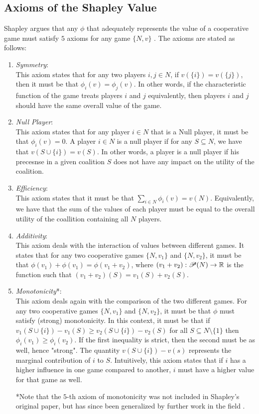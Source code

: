 \subsection{Axioms of the Shapley Value}
\label{sec:axioms}

Shapley argues that any $\phi$ that adequately represents the value of a cooperative game must satisfy $5$ axioms for any game $\{N,v\}$  \citep{shapleyValue}. The axioms are stated as follows:
\begin{enumerate}
    \item \textit{Symmetry}: \\
    This axiom states that for any two players $i,j \in N$, if $v(\{i\}) = v(\{j\})$, then it must be that $\phi_i(v) = \phi_j(v)$.  In other words, if the characteristic function of the game treats players $i$ and $j$ equivalently, then players $i$ and $j$ should have the same overall value of the game. 
    \item \textit{Null Player}: \\
    This axiom states that for any player $i \in N$ that is a Null player, it must be that $\phi_i(v) = 0$. A player $i \in N$ is a null player if for any $S \subseteq N$, we have that $v(S \cup \{i\}) = v(S)$. In other words, a player is a null player if his precesnse in a given coalition $S$ does not have any impact on the utility of the coalition.
    \item \textit{Efficiency}:  \\
    This axiom states that it must be that $\sum_{i\in N}\phi_i(v) = v(N)$. Equivalently, we have that the sum of the values of each player must be equal to the overall utility of the coallition containing all $N$ players.
    \item \textit{Additivity}: \\
    This axiom deals with the interaction of values between different games. It states that for any two cooperative games $\{N, v_1\}$ and $\{N,v_2\}$, it must be that $\phi(v_1) + \phi(v_1) = \phi(v_1+v_2)$, where $(v_1+v_2): \mathscr{P}(N) \to \mathbb{R}$ is the function such that $(v_1+v_2)(S) = v_1(S) + v_2(S)$.
    \item \textit{Monotonicity}*: \\
    This axiom deals again with the comparison of the two different games. For any two cooperative games $\{N, v_1\}$ and $\{N,v_2\}$, it must be that $\phi$ must satisfy (strong) monotonicity. In this context, it must be that if $v_1(S \cup \{i\}) - v_1(S) \geq v_2(S \cup \{i\}) - v_2(S)$ for all $S \subseteq N \setminus \{1\}$ then $\phi_i(v_1) \geq \phi_i(v_2)$. If the first inequality is strict, then the second must be as well, hence "strong". The quantity $v(S \cup \{i\}) - v(s)$ represents the marginal contribution of $i$ to $S$. Intuitively, this axiom states that if $i$ has a higher influence in one game compared to another, $i$ must have a higher value for that game as well.
    
    
*Note that the $5$-th axiom of monotonicity was not included in Shapley's original paper, but has since been generalized by further work in the field \citep{monotonicity}.    
\end{enumerate} 